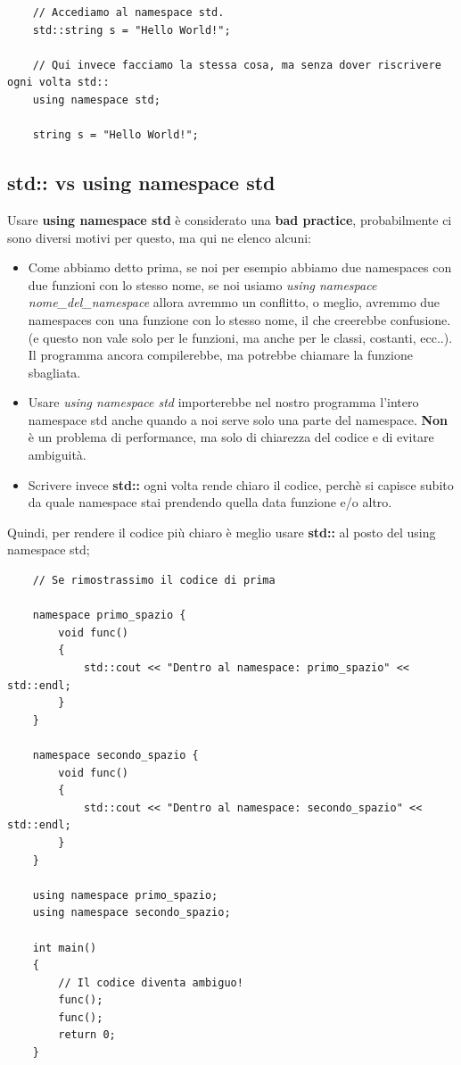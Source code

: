\begin{lstlisting}
	// Accediamo al namespace std.
	std::string s = "Hello World!";
	
	// Qui invece facciamo la stessa cosa, ma senza dover riscrivere ogni volta std::
	using namespace std;
	
	string s = "Hello World!";
\end{lstlisting}


\subsection{std:: vs using namespace std}

\textsf{\small Usare \textbf{using namespace std} è considerato una \textbf{\color{red}bad practice}, probabilmente ci sono diversi motivi per questo, ma qui ne elenco alcuni: } \\

\begin{itemize}
	\item \textsf{\small Come abbiamo detto prima, se noi per esempio abbiamo due namespaces con due funzioni con lo stesso nome, se noi usiamo \emph{using namespace nome\_del\_namespace} allora avremmo un conflitto, o meglio, avremmo due namespaces con una funzione con lo stesso nome, il che creerebbe confusione. (e questo non vale solo per le funzioni, ma anche per le classi, costanti, ecc..). Il programma ancora compilerebbe, ma potrebbe chiamare la funzione sbagliata.}
	\item \textsf{\small Usare \emph{using namespace std} importerebbe nel nostro programma l'intero namespace std anche quando a noi serve solo una parte del namespace. \textbf{Non} è un problema di performance, ma solo di chiarezza del codice e di evitare ambiguità.}
	\item \textsf{\small Scrivere invece \textbf{std::} ogni volta rende chiaro il codice, perchè si capisce subito da quale namespace stai prendendo quella data funzione e/o altro.}
\end{itemize}

\textsf{\small Quindi, per rendere il codice più chiaro è meglio usare \textbf{std::} al posto del using namespace std;} \\

\begin{lstlisting}
	// Se rimostrassimo il codice di prima
	
	namespace primo_spazio {
		void func()
		{
			std::cout << "Dentro al namespace: primo_spazio" << std::endl;
		}
	}
	
	namespace secondo_spazio {
		void func()
		{
			std::cout << "Dentro al namespace: secondo_spazio" << std::endl;
		}
	}

	using namespace primo_spazio;
	using namespace secondo_spazio;
	
	int main()
	{
		// Il codice diventa ambiguo!
		func();
		func();
		return 0;
	}
\end{lstlisting}

